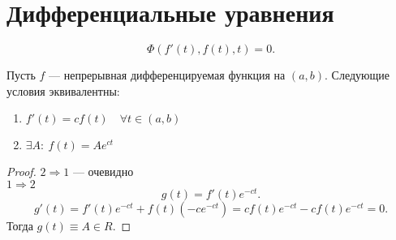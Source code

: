 \documentclass[11pt]{book}
\theoremstyle{definition}
\theoremstyle{plain}
\theoremstyle{plain}
\theoremstyle{definition}
\theoremstyle{remark}
\begin{document}
\section{Дифференциальные уравнения}
\[
    \Phi \left(f'(t) , f(t) , t \right) = 0
.\]
\begin{thm}
    Пусть $ f$ --- непрерывная дифференцируемая функция на $ (a, b)$.
    Следующие условия эквивалентны:
    \begin{enumerate}
	\item $ f'(t) = c f(t) \quad \forall t \in  (a, b)$
	\item $ \exists A: ~ f(t) = A e ^{ct}$
    \end{enumerate}
\end{thm}
\begin{proof}
    $2 \Longrightarrow  1$ --- очевидно \\
    $1 \Longrightarrow  2$
    \[
	g(t) = f'(t) e ^{-ct}
    .\]
    \[
	g'(t) = f'(t) e^{-ct} + f(t) (-c e^{-ct}) = c f(t) e^{-ct} - c f(t) e^{-ct} = 0
    .\]
    Тогда $ g(t) \equiv A \in  R$.

\end{proof}
\end{document}
